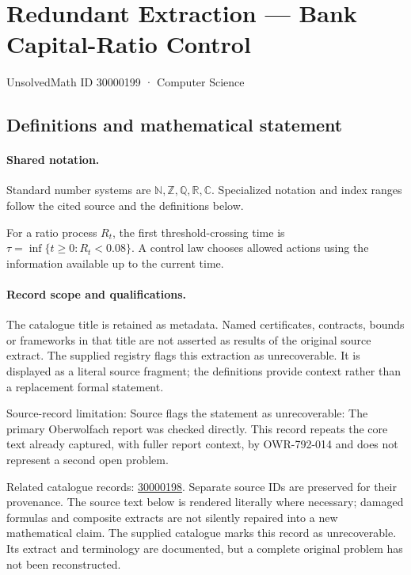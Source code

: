 \documentclass[11pt]{article}
\begin{document}
\setcounter{section}{30000198}
\section{Redundant Extraction — Bank Capital-Ratio Control}\label{30000199}
{\small\sffamily UnsolvedMath ID 30000199 · Computer Science}
\subsection{Definitions and mathematical statement}

\paragraph{Shared notation.}Standard number systems are $\mathbb N,\mathbb Z,\mathbb Q,\mathbb R,\mathbb C$. Specialized notation and index ranges follow the cited source and the definitions below.


For a ratio process $R_t$, the first threshold-crossing time is $\tau=\inf\{t\geq0:R_t<0.08\}$. A control law chooses allowed actions using the information available up to the current time.
\paragraph{Record scope and qualifications.}
The catalogue title is retained as metadata. Named certificates, contracts, bounds or frameworks in that title are not asserted as results of the original source extract.
The supplied registry flags this extraction as unrecoverable. It is displayed as a literal source fragment; the definitions provide context rather than a replacement formal statement.

Source-record limitation: Source flags the statement as unrecoverable: The primary Oberwolfach report was checked directly. This record repeats the core text already captured, with fuller report context, by OWR-792-014 and does not represent a second open problem.

Related catalogue records: \href{https://mehmetmars7.github.io/Erdosproblems-llm-hunter/problem.html?type=open_problems&id=30000198}{30000198}. Separate source IDs are preserved for their provenance.
The source text below is rendered literally where necessary; damaged formulas and composite extracts are not silently repaired into a new mathematical claim.
The supplied catalogue marks this record as unrecoverable. Its extract and terminology are documented, but a complete original problem has not been reconstructed.
\end{document}
